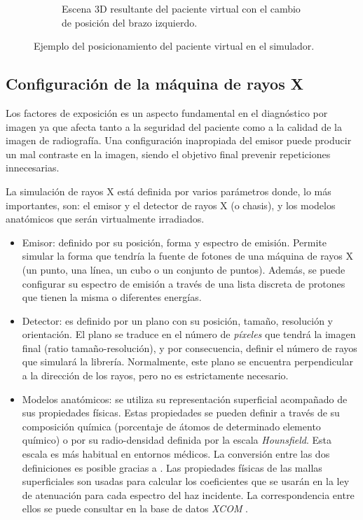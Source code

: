 \begin{figure}[h]
\begin{subfigure}[b]{0.45\linewidth}
        \caption{Escena 3D resultante del paciente virtual con el cambio de posición del brazo izquierdo.\label{subfig:US-B}}
    \end{subfigure}
    \caption{\label{fig:pose} Ejemplo del posicionamiento del paciente virtual en el simulador.}
   \end{figure}



\subsection{Configuración de la máquina de rayos X}
\label{xray:setupxray}

Los factores de exposición es un aspecto fundamental en el diagnóstico por imagen ya que afecta tanto a la seguridad del paciente como a la calidad de la imagen de radiografía. Una configuración inapropiada del emisor puede producir un mal contraste en la imagen, siendo el objetivo final prevenir repeticiones innecesarias.

La simulación de rayos X está definida por varios parámetros donde, lo más importantes, son: el emisor y el detector de rayos X (o chasis), y los modelos anatómicos que serán virtualmente irradiados. 
\begin{itemize}
    \item Emisor: definido por su posición, forma y espectro de emisión. Permite simular la forma que tendría la fuente de fotones de una máquina de rayos X (un punto, una línea, un cubo o un conjunto de puntos). Además, se puede configurar su espectro de emisión a través de una lista discreta de protones que tienen la misma o diferentes energías.
    \item Detector: es definido por un plano con su posición, tamaño, resolución y orientación. El plano se traduce en el número de \emph{píxeles} que tendrá la imagen final (ratio tamaño-resolución), y por consecuencia, definir el número de rayos que simulará la librería. Normalmente, este plano se encuentra perpendicular a la dirección de los rayos, pero no es estrictamente necesario.
    \item Modelos anatómicos: se utiliza su representación superficial acompañado de sus propiedades físicas. Estas propiedades se pueden definir a través de su composición química (porcentaje de átomos de determinado elemento químico) o por su radio-densidad definida por la escala \emph{Hounsfield}. Esta escala es más habitual en entornos médicos. La conversión entre las dos definiciones es posible gracias a \cite{Schneider2000}. Las propiedades físicas de las mallas superficiales son usadas para calcular los coeficientes que se usarán en la ley de atenuación para cada espectro del haz incidente. La correspondencia entre ellos se puede consultar en la base de datos \emph{XCOM} \cite{XCOM}.
\end{itemize}

